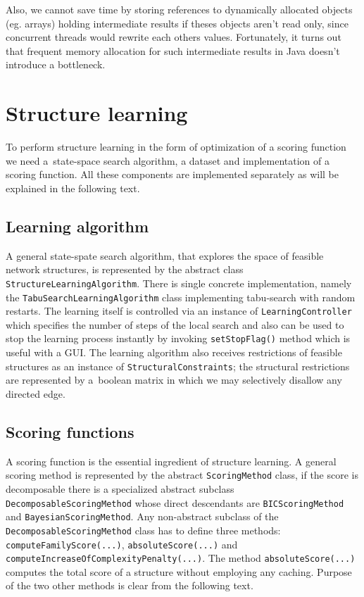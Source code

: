 \documentclass[english,cover]{fitthesis} %
\newcommand{\srccode}[1]{{\tt #1}}         %
\begin{document}
Also, we cannot save time by storing references to dynamically allocated objects (eg. arrays) holding intermediate results if theses objects aren't read only, since concurrent threads would rewrite each others values. Fortunately, it turns out that frequent memory allocation for such intermediate results in Java doesn't introduce a bottleneck.







\section{Structure learning}
To perform structure learning in the form of optimization of a scoring function we need a~state-space search algorithm, a dataset and implementation of a scoring function. All these components are implemented separately as will be explained in the following text.

\subsection{Learning algorithm}
A general state-spate search algorithm, that explores the space of feasible network structures, is represented by the abstract class \srccode{StructureLearningAlgorithm}. There is single concrete implementation, namely the \srccode{TabuSearchLearningAlgorithm} class implementing tabu-search with random restarts. The learning itself is controlled via an instance of \srccode{LearningController} which specifies the number of steps of the local search and also can be used to stop the learning process instantly by invoking \srccode{setStopFlag()} method which is useful with a GUI. The learning algorithm also receives restrictions of feasible structures as an instance of \srccode{StructuralConstraints}; the structural restrictions are represented by a~boolean matrix in which we may selectively disallow any directed edge.



\subsection{Scoring functions}
A scoring function is the essential ingredient of structure learning. A general scoring method is represented by the abstract \srccode{ScoringMethod} class, if the score is decomposable there is a specialized abstract subclass \srccode{DecomposableScoringMethod} whose direct descendants are \srccode{BICScoringMethod} and \srccode{BayesianScoringMethod}. Any non-abstract subclass of the \srccode{DecomposableScoringMethod} class has to define three methods: \srccode{computeFamilyScore(...)}, \srccode{absoluteScore(...)} and \srccode{computeIncreaseOfComplexityPenalty(...)}. The method \srccode{absoluteScore(...)} computes the total score of a structure without employing any caching. Purpose of the two other methods is clear from the following text.
\end{document}
